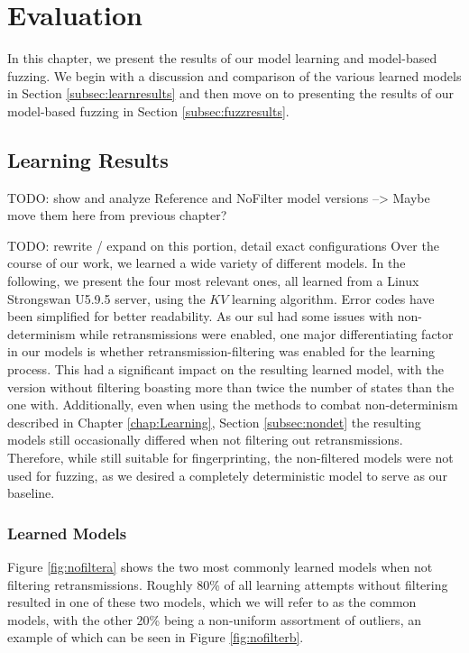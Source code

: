 %
%
% 
% 
% 

\chapter{Evaluation} \label{chap:Evaluation}

In this chapter, we present the results of our model learning and model-based fuzzing. We begin with a discussion and comparison of the various learned models in Section \ref{subsec:learnresults} and then move on to presenting the results of our model-based fuzzing in Section \ref{subsec:fuzzresults}.



\section{Learning Results} \label{sec:learnresults}
TODO: show and analyze Reference and NoFilter model versions --> Maybe move them here from previous chapter?

TODO: rewrite / expand on this portion, detail exact configurations
Over the course of our work, we learned a wide variety of different models. In the following, we present the four most relevant ones, all learned from a Linux Strongswan U5.9.5 server, using the $KV$ learning algorithm. Error codes have been simplified for better readability. As our \ac{sul} had some issues with non-determinism while retransmissions were enabled, one major differentiating factor in our models is whether retransmission-filtering was enabled for the learning process. This had a significant impact on the resulting learned model, with the version without filtering boasting more than twice the number of states than the one with. Additionally, even when using the methods to combat non-determinism described in Chapter \ref{chap:Learning}, Section \ref{subsec:nondet} the resulting models still occasionally differed when not filtering out retransmissions. Therefore, while still suitable for fingerprinting, the non-filtered models were not used for fuzzing, as we desired a completely deterministic model to serve as our baseline.

\subsection{Learned Models} \label{subsec:models}
Figure \ref{fig:nofiltera} shows the two most commonly learned models when not filtering retransmissions. Roughly 80\% of all learning attempts without filtering resulted in one of these two models, which we will refer to as the common models, with the other 20\% being a non-uniform assortment of outliers, an example of which can be seen in Figure \ref{fig:nofilterb}. 


